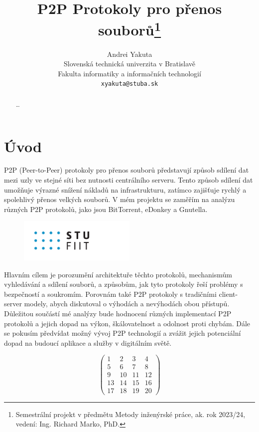 \documentclass[10pt,twocolumn,twoside,czech,a4paper]{article}
\title{P2P Protokoly pro přenos souborů\thanks{Semestrální projekt v předmětu Metody inženýrské práce, ak. rok 2023/24, vedení: Ing. Richard Marko, PhD.}}
\author{Andrei Yakuta\\[2pt]
	{\small Slovenská technická univerzita v Bratislavě}\\
	{\small Fakulta informatiky a informačních technologií}\\
	{\small \texttt{xyakuta@stuba.sk}}
	}
\begin{document}
\maketitle

\begin{abstract}
\ldots
\end{abstract}



\section{Úvod}

P2P (Peer-to-Peer) protokoly pro přenos souborů představují způsob sdílení dat mezi uzly ve stejné síti bez nutnosti centrálního serveru.
Tento způsob sdílení dat umožňuje výrazné snížení nákladů na infrastrukturu, zatímco zajišťuje rychlý a spolehlivý přenos velkých souborů.
V mém projektu se zaměřím na analýzu různých P2P protokolů, jako jsou BitTorrent, eDonkey a Gnutella.

\begin{figure}
	\centering
	\includegraphics[width=0.5\textwidth]{logo.pdf}
\end{figure}

Hlavním cílem je porozumění architektuře těchto protokolů, mechanismům vyhledávání a sdílení souborů, a způsobům, jak tyto protokoly řeší problémy s bezpečností a soukromím.
Porovnám také P2P protokoly s tradičními client-server modely, abych diskutoval o výhodách a nevýhodách obou přístupů.
Důležitou součástí mé analýzy bude hodnocení různých implementací P2P protokolů a jejich dopad na výkon, škálovatelnost a odolnost proti chybám.
Dále se pokusím předvídat možný vývoj P2P technologií a zvážit jejich potenciální dopad na budoucí aplikace a služby v digitálním světě.


\begin{equation*}
	\begin{pmatrix}
	  1 & 2 & 3 & 4 \\
	  5 & 6 & 7 & 8 \\
	  9 & 10 & 11 & 12 \\
	  13 & 14 & 15 & 16 \\
	  17 & 18 & 19 & 20
	\end{pmatrix}
\end{equation*}
\end{document}
